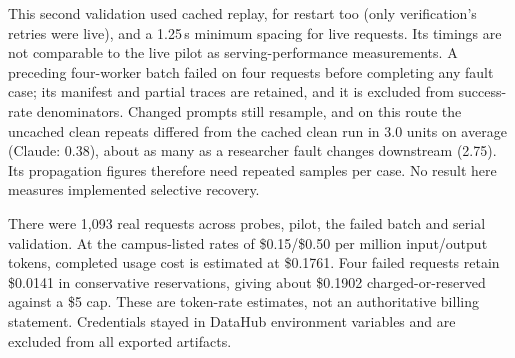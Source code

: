  This second validation used cached replay, for restart too (only
verification's retries were live), and a 1.25\,s minimum spacing for live requests. Its timings are not comparable to the
live pilot as serving-performance measurements. A preceding four-worker batch
failed on four requests before completing any fault case; its manifest and
partial traces are retained, and it is excluded from success-rate denominators.
Changed prompts still resample, and on this route the uncached clean repeats differed
from the cached clean run in 3.0 units on average (Claude: 0.38), about as many as a
researcher fault changes downstream (2.75). Its propagation figures therefore need
repeated samples per case. No result here measures implemented selective recovery.

 There were 1,093 real requests across probes, pilot,
the failed batch and serial validation. At the campus-listed rates of \$0.15/\$0.50
per million input/output tokens, completed usage cost is estimated at \$0.1761.
Four failed requests retain \$0.0141 in conservative reservations, giving
about \$0.1902 charged-or-reserved against a \$5 cap. These are token-rate estimates,
not an authoritative billing statement. Credentials stayed in DataHub environment
variables and are excluded from all exported artifacts.
